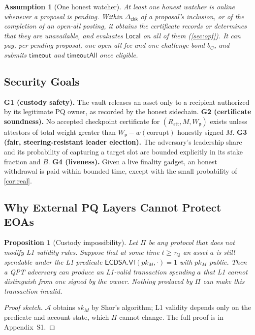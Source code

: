 \documentclass[10pt,journal,compsoc]{IEEEtran}
\theoremstyle{tplain}
\newtheorem{proposition}[theorem]{Proposition}
\theoremstyle{tdef}
\newtheorem{assumption}{Assumption}
\theoremstyle{remark}
\newcommand{\supp}[1]{Appendix~#1}
\newcommand{\Wp}{W_{\mathsf{p}}}
\newcommand{\Ratt}{R_{\mathsf{att}}}
\begin{document}
\begin{assumption}[One honest watcher]\label{asm:watcher}
At least one honest watcher is online whenever a proposal is pending. Within $\Delta_{\mathsf{chk}}$ of a proposal's inclusion, or of the completion of an open-all posting, it obtains the certificate records or determines that they are unavailable, and evaluates $\mathsf{Local}$ on all of them (\cref{sec:opf}). It can pay, per pending proposal, one open-all fee and one challenge bond $b_C$, and submits $\mathsf{timeout}$ and $\mathsf{timeoutAll}$ once eligible.
\end{assumption}

\subsection{Security Goals}
\noindent\textbf{G1 (custody safety).} The vault releases an asset only to a recipient authorized by its legitimate PQ owner, as recorded by the honest sidechain.
\noindent\textbf{G2 (certificate soundness).} No accepted checkpoint certificate for $(\Ratt,M,\Wp)$ exists unless attestors of total weight greater than $\Wp-w(\text{corrupt})$ honestly signed $M$.
\noindent\textbf{G3 (fair, steering-resistant leader election).} The adversary's leadership share and its probability of capturing a target slot are bounded explicitly in its stake fraction and $B$.
\noindent\textbf{G4 (liveness).} Given a live finality gadget, an honest withdrawal is paid within bounded time, except with the small probability of \cref{cor:real}.

\subsection{Why External PQ Layers Cannot Protect EOAs}

\begin{proposition}[Custody impossibility]\label{prop:impossible}
Let $\Pi$ be any protocol that does not modify L1 validity rules. Suppose that at some time $t\ge\tau_Q$ an asset $a$ is still spendable under the L1 predicate $\mathsf{ECDSA.Vf}(pk_M,\cdot)=1$ with $pk_M$ public. Then a QPT adversary can produce an L1-valid transaction spending $a$ that L1 cannot distinguish from one signed by the owner. Nothing produced by $\Pi$ can make this transaction invalid.
\end{proposition}
\begin{proof}[Proof sketch]
$\mathcal{A}$ obtains $sk_M$ by Shor's algorithm; L1 validity depends only on the predicate and account state, which $\Pi$ cannot change. The full proof is in \supp{S1}.
\end{proof}
\end{document}
